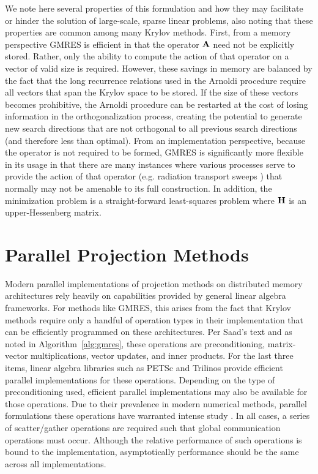 We note here several properties of this formulation and how they may
facilitate or hinder the solution of large-scale, sparse linear
problems, also noting that these properties are common among many
Krylov methods. First, from a memory perspective GMRES is efficient in
that the operator $\mathbf{A}$ need not be explicitly stored. Rather, only
the ability to compute the action of that operator on a vector of
valid size is required. However, these savings in memory are balanced
by the fact that the long recurrence relations used in the Arnoldi
procedure require all vectors that span the Krylov space to be
stored. If the size of these vectors becomes prohibitive, the Arnoldi
procedure can be restarted at the cost of losing information in the
orthogonalization process, creating the potential to generate new
search directions that are not orthogonal to all previous search
directions (and therefore less than optimal). From an implementation
perspective, because the operator is not required to be formed, GMRES
is significantly more flexible in its usage in that there are many
instances where various processes serve to provide the action of that
operator (e.g. radiation transport sweeps \cite{evans_denovo:_2010})
that normally may not be amenable to its full construction. In
addition, the minimization problem is a straight-forward least-squares
problem where $\mathbf{H}$ is an upper-Hessenberg matrix.

\section{Parallel Projection Methods\ }
\label{sec:parallel_krylov_methods}
Modern parallel implementations of projection methods on distributed
memory architectures rely heavily on capabilities provided by general
linear algebra frameworks. For methods like GMRES, this arises from
the fact that Krylov methods require only a handful of operation types
in their implementation that can be efficiently programmed on these
architectures. Per Saad's text \cite{saad_iterative_2003} and as
noted in Algorithm~\ref{alg:gmres}, these operations are
preconditioning, matrix-vector multiplications, vector updates, and
inner products. For the last three items, linear algebra libraries
such as PETSc \cite{gropp_scalable_1993} and Trilinos
\cite{heroux_overview_2005} provide efficient parallel
implementations for these operations. Depending on the type of
preconditioning used, efficient parallel implementations may also be
available for those operations. Due to their prevalence in modern
numerical methods, parallel formulations these operations have
warranted intense study \cite{tuminaro_parallel_1998}. In all cases, a series
of scatter/gather operations are required such that global
communication operations must occur. Although the relative performance
of such operations is bound to the implementation, asymptotically
performance should be the same across all implementations.

